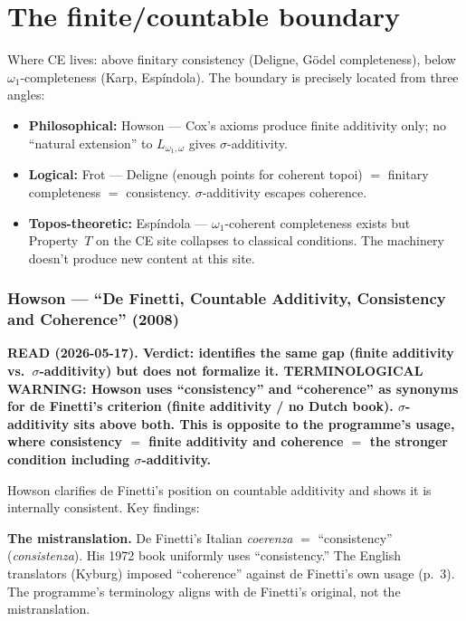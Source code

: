 \part{The finite/countable boundary}

Where CE lives: above finitary consistency (Deligne, G\"odel
completeness), below $\omega_1$-completeness (Karp, Esp\'indola).
The boundary is precisely located from three angles:
\begin{itemize}[nosep]
  \item \textbf{Philosophical:} Howson --- Cox's axioms produce
    finite additivity only; no ``natural extension'' to
    $L_{\omega_1,\omega}$ gives $\sigma$-additivity.
  \item \textbf{Logical:} Frot --- Deligne (enough points for
    coherent topoi) $=$ finitary completeness $=$ consistency.
    $\sigma$-additivity escapes coherence.
  \item \textbf{Topos-theoretic:} Esp\'{i}ndola --- $\omega_1$-coherent
    completeness exists but Property~$T$ on the CE site collapses
    to classical conditions.  The machinery doesn't produce new
    content at this site.
\end{itemize}

\section{Howson --- ``De Finetti, Countable Additivity, Consistency
and Coherence'' (2008)}

\textbf{READ (2026-05-17).  Verdict: identifies the same gap
(finite additivity vs.\ $\sigma$-additivity) but does not
formalize it.  TERMINOLOGICAL WARNING: Howson uses ``consistency''
and ``coherence'' as synonyms for de Finetti's criterion (finite
additivity / no Dutch book).  $\sigma$-additivity sits above both.
This is opposite to the programme's usage, where consistency $=$
finite additivity and coherence $=$ the stronger condition
including $\sigma$-additivity.}

\medskip\noindent
Howson clarifies de Finetti's position on countable additivity
and shows it is internally consistent.  Key findings:

\medskip\noindent
\textbf{The mistranslation.}  De Finetti's Italian \emph{coerenza}
$=$ ``consistency'' (\emph{consistenza}).  His 1972 book uniformly
uses ``consistency.''  The English translators (Kyburg) imposed
``coherence'' against de Finetti's own usage (p.~3).  The
programme's terminology aligns with de Finetti's original, not the
mistranslation.

